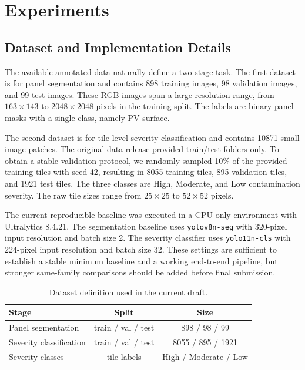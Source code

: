 \documentclass[conference]{IEEEtran}
\newcommand{\SegTrain}{898}
\newcommand{\SegVal}{98}
\newcommand{\SegTest}{99}
\newcommand{\ClsTrain}{8055}
\newcommand{\ClsVal}{895}
\newcommand{\ClsTest}{1921}
\newcommand{\ClsTotal}{10871}
\begin{document}
\section{Experiments}
\subsection{Dataset and Implementation Details}
The available annotated data naturally define a two-stage task. The first dataset is for panel segmentation and contains \SegTrain{} training images, \SegVal{} validation images, and \SegTest{} test images. These RGB images span a large resolution range, from $163 \times 143$ to $2048 \times 2048$ pixels in the training split. The labels are binary panel masks with a single class, namely PV surface.

The second dataset is for tile-level severity classification and contains \ClsTotal{} small image patches. The original data release provided train/test folders only. To obtain a stable validation protocol, we randomly sampled 10\% of the provided training tiles with seed 42, resulting in \ClsTrain{} training tiles, \ClsVal{} validation tiles, and \ClsTest{} test tiles. The three classes are High, Moderate, and Low contamination severity. The raw tile sizes range from $25 \times 25$ to $52 \times 52$ pixels.

The current reproducible baseline was executed in a CPU-only environment with Ultralytics 8.4.21. The segmentation baseline uses \texttt{yolov8n-seg} with 320-pixel input resolution and batch size 2. The severity classifier uses \texttt{yolo11n-cls} with 224-pixel input resolution and batch size 32. These settings are sufficient to establish a stable minimum baseline and a working end-to-end pipeline, but stronger same-family comparisons should be added before final submission.

\begin{table}[htbp]
\caption{Dataset definition used in the current draft.}
\label{tab_dataset}
\centering
\begin{tabular}{lcc}
\toprule
Stage & Split & Size \\
\midrule
Panel segmentation & train / val / test & \SegTrain{} / \SegVal{} / \SegTest{} \\
Severity classification & train / val / test & \ClsTrain{} / \ClsVal{} / \ClsTest{} \\
Severity classes & tile labels & High / Moderate / Low \\
\bottomrule
\end{tabular}
\end{table}
\end{document}

